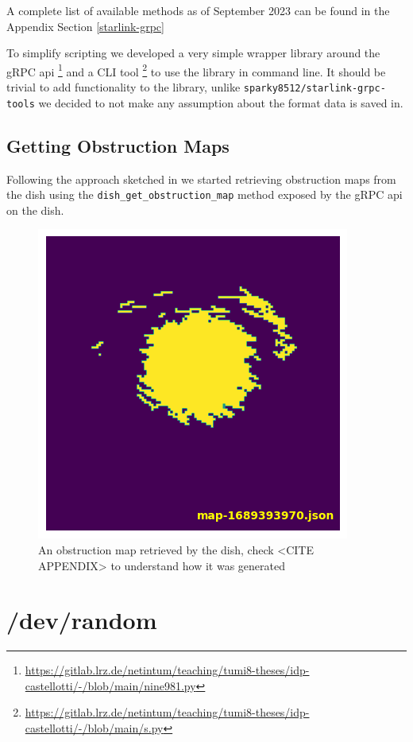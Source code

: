 \documentclass[IN,11pt,twoside,openright,bachelor,english]{tumthesis}
\begin{document}
A complete list of available methods as of September 2023 can be found in the Appendix Section \ref{starlink-grpc}

To simplify scripting we developed a very simple wrapper library around the gRPC api  \footnote{\url{https://gitlab.lrz.de/netintum/teaching/tumi8-theses/idp-castellotti/-/blob/main/nine981.py}} and a CLI tool \footnote{\url{https://gitlab.lrz.de/netintum/teaching/tumi8-theses/idp-castellotti/-/blob/main/s.py}} to use the library in command line. It should be trivial to add functionality to the library, unlike \texttt{sparky8512/starlink-grpc-tools} we decided to not make any assumption about the format data is saved in.

\section{Getting Obstruction Maps}
Following the approach sketched in \cite{izhikevich2023democratizing} we started retrieving obstruction maps from the dish using the \texttt{dish\_get\_obstruction\_map} method exposed by the gRPC api on the dish.

\begin{figure}	
	\centering
	\includegraphics[]{img/obstruction_map_finale.png}
	\caption{An obstruction map retrieved by the dish, check <CITE APPENDIX> to understand how it was generated}
\end{figure}

\chapter{/dev/random}
\end{document}
